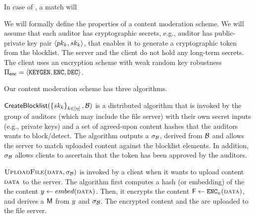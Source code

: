 
\item In case of \contentModFuncExact, a match will 

\enumListEnd
\fi 


%

\iffalse 
We will formally define the properties of a content moderation scheme. 
We will assume that each auditor has cryptographic secrets, e.g., auditor \auditorIdx has public-private 
key pair  $\tupleDefn{\pubKey[\auditorIdx], 
\privKey[\auditorIdx]}$, that enables it to generate a cryptographic token 
from the blocklist. The server and the client do not hold any long-term secrets. 
The client uses an encryption scheme with weak random key robustness 
$\encryptionSchemeDefn$.

Our content moderation scheme has three algorithms.

\enumListStart
	\item \underline{$\createBlocklist(\setOfAuditorPrivkeys, \blocklist)$} 
	 is a distributed algorithm that is invoked by the group of \numAuditors auditors (which may  
	 include the file server) with their own secret inputs (e.g., private keys) and a set of agreed-upon 
	 content hashes \blocklist that the auditors wants to block/detect.
        The algorithm outputs a \blklistToken $\genericSig[\blocklist]$, derived from $\blocklist$ 
        and allows the server to match uploaded content against the blocklist elements. In addition,  
	$\genericSig[\blocklist]$ allows clients to ascertain that the token has been approved by the auditors. 

	\item \underline{$\uploadFile(\clientData, \genericSig[\blocklist])$} is invoked by a client when it 
	wants to upload content $\clientData$ to the server. The algorithm first computes a hash (or embedding) of the the content 
	$\genericCInputElmt \assign \contentHash(\clientData)$. 
	Then, it encrypts the content $\cOutputFile \assign 
	\encrypt[\genericSymmKey](\clientData)$,
	and derives a \contentToken $\cOutputMeta$ from $\genericCInputElmt$ and $\genericSig[\blocklist]$. The encrypted content and the \contentToken are uploaded to the file server. 
	
